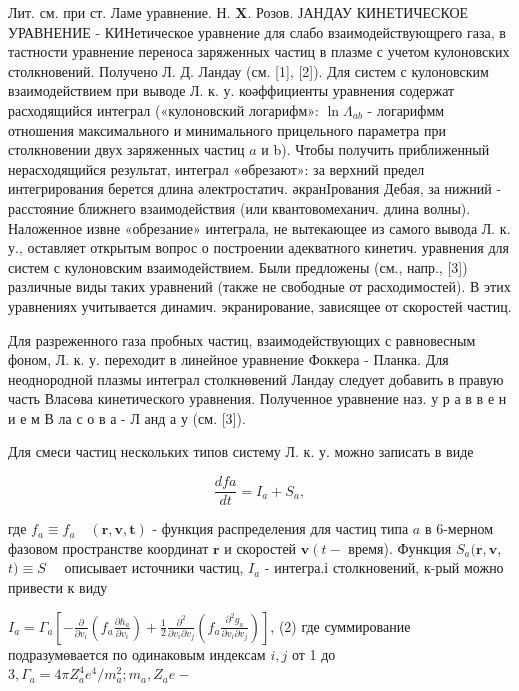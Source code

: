 \documentclass[10pt]{article}
\begin{document}
Лит. см. при ст. Ламе уравнение. Н. $\boldsymbol{X}$. Розов. ЈАНДАУ КИНЕТИЧЕСКОЕ УРАВНЕНИЕ - КИНетическое уравнение для слабо взаимодействующрего газа, в тастности уравнение переноса заряженных частиц в плазме с учетом кулоновских столкновений. Получено Л. Д. Ландау (см. [1], [2]). Для систем с кулоновским взаимодействием при выводе Л. к. у. коәффициенты уравнения содержат расходящийся интеграл («кулоновский логарифм»: $\ln \Lambda_{a b}$ - логарифмм отношения максимального и минимального прицельного параметра при столкновении двух заряженных частиц $a$ и b). Чтобы получить приближенный нерасходящийся результат, интеграл «өбрезают»: за верхний предел интегрирования берется длина әлектростатич. әкранIрования Дебая, за нижний - расстояние ближнего взаимодействия (или квантовомеханич. длина волны). Наложенное извне «обрезание» интеграла, не вытекающее из самого вывода Л. к. у., оставляет открытым вопрос о построении адекватного кинетич. уравнения для систем с кулоновским взаимодействием. Были предложены (см., напр., [3]) различные виды таких уравнений (также не свободные от расходимостей). В этих уравнениях учитывается динамич. экранирование, зависящее от скоростей частиц.



Для разреженного газа пробных частиц, взаимодействующих с равновесным фоном, Л. к. у. переходит в линейное уравнение Фоккера - Планка. Для неоднородной плазмы интеграл столкнөвений Ландау следует добавить в правую часть Власөва кинетического уравнения. Полученное уравнение наз. у р а в в е н и е м В ла с о в а - Л анд а у (см. [3]).



Для смеси частиц нескольких типов систему Л. к. у. можно записать в виде



\[

\frac{d f a}{d t}=I_{a}+S_{a},

\]



где $f_{a} \equiv f_{a} \quad(\boldsymbol{r}, \boldsymbol{v}, \boldsymbol{t})$ - функция распределения для частиц типа $a$ в 6-мерном фазовом пространстве координат $\boldsymbol{r}$ и скоростей $\boldsymbol{v}\left(t-\right.$ время). Функция $S_{a}(\boldsymbol{r}, \boldsymbol{v}$, $t) \equiv S \quad$ описывает источники частиц, $I_{a}$ - интегра.і столкновений, к-рый можно привести к виду



$I_{a}=\Gamma_{a}\left[-\frac{\partial}{\partial v_{i}}\left(f_{a} \frac{\partial h_{a}}{\partial v_{i}}\right)+\frac{1}{2} \frac{\partial^{2}}{\partial v_{i} \partial v_{j}}\left(f_{a} \frac{\partial^{2} g_{a}}{\partial v_{i} \partial v_{j}}\right)\right]$, (2) где суммирование подразумөвается по одинаковым индексам $i, j$ от 1 до $3, \Gamma_{a}=4 \pi Z_{a}^{4} e^{4} / m_{a}^{2} ; m_{a}, Z_{a} e-$
\end{document}
